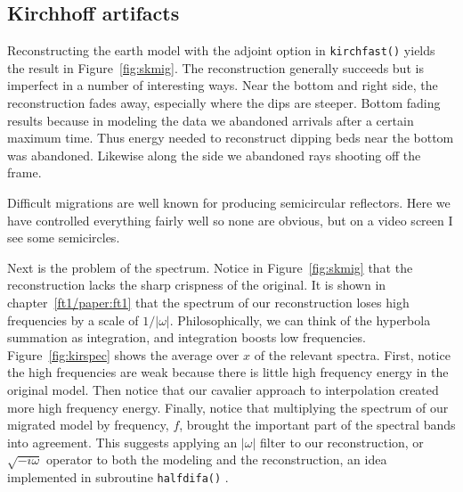 \subsection{Kirchhoff artifacts}
Reconstructing the earth model with the adjoint option in \texttt{kirchfast()} 
yields the result in Figure~\ref{fig:skmig}. %
%
The reconstruction generally succeeds
but is imperfect in a number of interesting ways.
Near the bottom and right side, the reconstruction fades away,
especially where the dips are steeper.
Bottom fading results because in modeling the data
we abandoned arrivals after a certain maximum time.
Thus energy needed to reconstruct dipping beds near the bottom
was abandoned.
Likewise along the side we abandoned rays shooting off the frame.

\par
Difficult migrations are well known for producing semicircular reflectors.
Here we have controlled everything fairly well so none are obvious,
but on a video screen I see some semicircles.

\par
Next is the problem of the spectrum.
Notice in Figure~\ref{fig:skmig} that the reconstruction
lacks the sharp crispness of the original.
It is shown in chapter~\ref{ft1/paper:ft1}
that the spectrum of our reconstruction
loses high frequencies by a scale of $1/ | \omega |$.
Philosophically, we can think of the hyperbola summation
as integration, and integration boosts low frequencies.
Figure~\ref{fig:kirspec} shows the average over $x$
of the relevant spectra. %
First, notice the high frequencies are weak because
there is little high frequency energy in the original model.
Then notice that our cavalier approach to interpolation
created more high frequency energy.
Finally, notice that multiplying the spectrum of our
migrated model by frequency, $f$, brought the important
part of the spectral bands into agreement.
This suggests applying an $|\omega |$ filter to our reconstruction,
or $\sqrt{-i\omega}$ operator to both the modeling and the reconstruction,
an idea implemented in subroutine \texttt{halfdifa()} .

